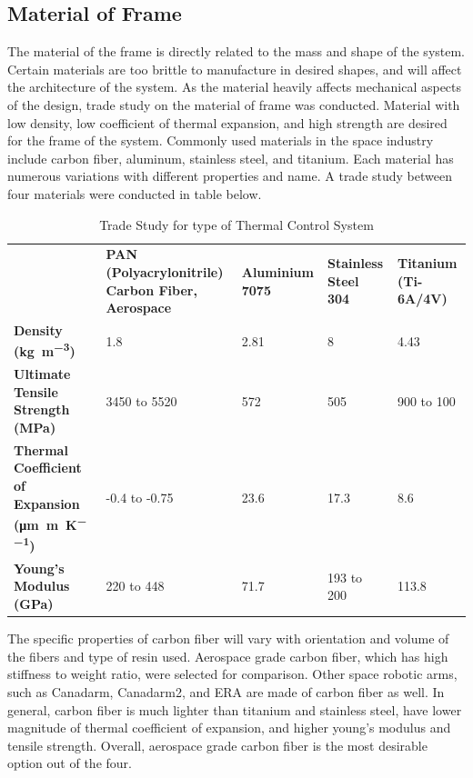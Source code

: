 \documentclass[12pt, letterpaper]{article}
\begin{document}
\subsection{Material of Frame}
\label{sect:materialto}
The material of the frame is directly related to the mass and shape of the system. Certain materials are too brittle to manufacture in desired shapes, and will affect the architecture of the system. As the material heavily affects mechanical aspects of the design, trade study on the material of frame was conducted. Material with low density, low coefficient of thermal expansion, and high strength are desired for the frame of the system. Commonly used materials in the space industry include carbon fiber, aluminum, stainless steel, and titanium. Each material has numerous variations with different properties and name. A trade study between four materials were conducted in table below.
\begin{table}[H]
\centering
\caption{Trade Study for type of Thermal Control System}
\begin{tabular}{|P{3.6cm}|P{3.1cm}|P{2.4cm}|P{2.3cm}|P{2.5cm}|}
\hline
	&	\textbf{PAN (Polyacrylonitrile) Carbon Fiber, Aerospace \cite{carbonfibreprop}}	&\textbf{Aluminium 7075 \cite{alumniumprop}}	&	\textbf{Stainless Steel 304 \cite{steelprop}}	&	\textbf{Titanium (Ti-6A/4V) \cite{titaniumprop}}	\\\hhline{|=|=|=|=|=|}
\textbf{Density (\si{\kilo\gram\per\metre\cubed})}	&	
1.8	&	2.81	&	8	&	4.43	\\\hline
\textbf{Ultimate Tensile Strength (\si{\mega\pascal})}	&
3450 to 5520	&	572	&	505	&	900 to 100	\\\hline
\textbf{Thermal Coefficient of Expansion (\si{\micro\metre\per\metre\per\kelvin})}	&	
-0.4 to -0.75	&	23.6	&	17.3	&	8.6	\\\hline
\textbf{Young's Modulus (\si{\giga\pascal})}	&
220 to 448	&	71.7	&	193 to 200	&	113.8	\\\hline
\end{tabular}
\label{table:materialto}
\end{table}

The specific properties of carbon fiber will vary with orientation and volume of the fibers and type of resin used. Aerospace grade carbon fiber, which has high stiffness to weight ratio, were selected for comparison. Other space robotic arms, such as Canadarm, Canadarm2, and ERA are made of carbon fiber as well. In general, carbon fiber is much lighter than titanium and stainless steel, have lower magnitude of thermal coefficient of expansion, and higher young’s modulus and tensile strength. Overall, aerospace grade carbon fiber is the most desirable option out of the four.
\end{document}

